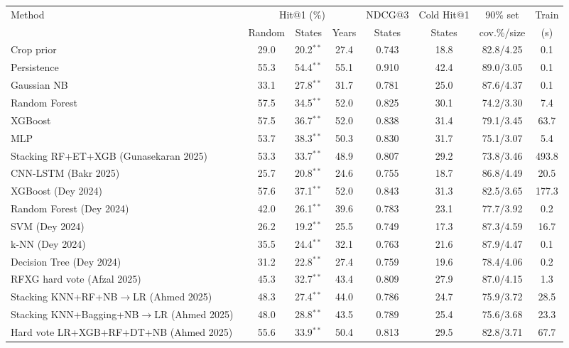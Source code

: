 \begin{tabular}{lccccccc}
\toprule
Method & \multicolumn{3}{c}{Hit@1 (\%)} & NDCG@3 & Cold Hit@1 & 90\% set & Train \\
\cmidrule(lr){2-4}
 & Random & States & Years & States & States & cov.\%/size & (s) \\
\midrule
Crop prior & 29.0 & 20.2$^{**}$ & 27.4 & 0.743 & 18.8 & 82.8/4.25 & 0.1 \\
Persistence & 55.3 & 54.4$^{**}$ & 55.1 & 0.910 & 42.4 & 89.0/3.05 & 0.1 \\
Gaussian NB & 33.1 & 27.8$^{**}$ & 31.7 & 0.781 & 25.0 & 87.6/4.37 & 0.1 \\
Random Forest & 57.5 & 34.5$^{**}$ & 52.0 & 0.825 & 30.1 & 74.2/3.30 & 7.4 \\
XGBoost & 57.5 & 36.7$^{**}$ & 52.0 & 0.838 & 31.4 & 79.1/3.45 & 63.7 \\
MLP & 53.7 & 38.3$^{**}$ & 50.3 & 0.830 & 31.7 & 75.1/3.07 & 5.4 \\
Stacking RF+ET+XGB (Gunasekaran 2025)~\cite{gunasekaran2025} & 53.3 & 33.7$^{**}$ & 48.9 & 0.807 & 29.2 & 73.8/3.46 & 493.8 \\
CNN-LSTM (Bakr 2025)~\cite{bakr2025} & 25.7 & 20.8$^{**}$ & 24.6 & 0.755 & 18.7 & 86.8/4.49 & 20.5 \\
XGBoost (Dey 2024)~\cite{dey2024} & 57.6 & 37.1$^{**}$ & 52.0 & 0.843 & 31.3 & 82.5/3.65 & 177.3 \\
Random Forest (Dey 2024)~\cite{dey2024} & 42.0 & 26.1$^{**}$ & 39.6 & 0.783 & 23.1 & 77.7/3.92 & 0.2 \\
SVM (Dey 2024)~\cite{dey2024} & 26.2 & 19.2$^{**}$ & 25.5 & 0.749 & 17.3 & 87.3/4.59 & 16.7 \\
k-NN (Dey 2024)~\cite{dey2024} & 35.5 & 24.4$^{**}$ & 32.1 & 0.763 & 21.6 & 87.9/4.47 & 0.1 \\
Decision Tree (Dey 2024)~\cite{dey2024} & 31.2 & 22.8$^{**}$ & 27.4 & 0.759 & 19.6 & 78.4/4.06 & 0.2 \\
RFXG hard vote (Afzal 2025)~\cite{afzal2025} & 45.3 & 32.7$^{**}$ & 43.4 & 0.809 & 27.9 & 87.0/4.15 & 1.3 \\
Stacking KNN+RF+NB$\to$LR (Ahmed 2025)~\cite{ahmed2025} & 48.3 & 27.4$^{**}$ & 44.0 & 0.786 & 24.7 & 75.9/3.72 & 28.5 \\
Stacking KNN+Bagging+NB$\to$LR (Ahmed 2025)~\cite{ahmed2025} & 48.0 & 28.8$^{**}$ & 43.5 & 0.789 & 25.4 & 75.6/3.68 & 23.3 \\
Hard vote LR+XGB+RF+DT+NB (Ahmed 2025)~\cite{ahmed2025} & 55.6 & 33.9$^{**}$ & 50.4 & 0.813 & 29.5 & 82.8/3.71 & 67.7 \\

\end{tabular}
